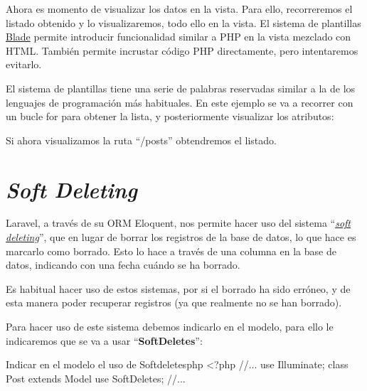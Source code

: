 
Ahora es momento de visualizar los datos en la vista. Para ello, recorreremos el listado obtenido y lo visualizaremos, todo ello en la vista. El sistema de plantillas \href{https://laravel.com/docs/10.x/blade}{Blade} permite introducir funcionalidad similar a PHP en la vista mezclado con HTML. También permite incrustar código PHP directamente, pero intentaremos evitarlo.

El sistema de plantillas tiene una serie de palabras reservadas similar a la de los lenguajes de programación más habituales. En este ejemplo se va a recorrer con un bucle for para obtener la lista, y posteriormente visualizar los atributos:


Si ahora visualizamos la ruta “/posts” obtendremos el listado.



\chapter{\textit{Soft Deleting}}

Laravel, a través de su ORM Eloquent, nos permite hacer uso del sistema “\textit{\href{https://laravel.com/docs/10.x/eloquent\#soft-deleting}{soft deleting}}”, que en lugar de borrar los registros de la base de datos, lo que hace es marcarlo como borrado. Esto lo hace a través de una columna en la base de datos, indicando con una fecha cuándo se ha borrado.

Es habitual hacer uso de estos sistemas, por si el borrado ha sido erróneo, y de esta manera poder recuperar registros (ya que realmente no se han borrado).

Para hacer uso de este sistema debemos indicarlo en el modelo, para ello le indicaremos que se va a usar “\textbf{SoftDeletes}”:

\begin{mycode}{Indicar en el modelo el uso de Softdeletes}{php}{}
<?php
//...
use Illuminate\Database\Eloquent\SoftDeletes;
class Post extends Model{
    use SoftDeletes;
    //...
}
\end{mycode}

